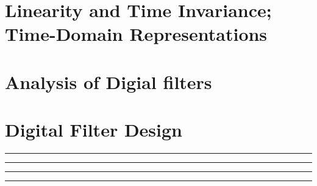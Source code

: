 \documentclass[10pt]{article}
\begin{document}
\newcommand{\josquote}[1]{
    \framebox{
    \parbox{\textwidth}{
    \textit{#1}
    }
    }
}

\newcommand{\paulhint}[1]{
    #1
}

\setlength\parindent{0pt}
\section{Linearity and Time Invariance; Time-Domain Representations}
%
%
%
%
%
\section{Analysis of Digial filters}
%
%
%
%
%
\section{Digital Filter Design}

\noindent\rule[0.5ex]{\linewidth}{0.5pt}

\noindent\rule[0.5ex]{\linewidth}{0.5pt}

\noindent\rule[0.5ex]{\linewidth}{0.5pt}

\noindent\rule[0.5ex]{\linewidth}{0.5pt}

\end{document}
